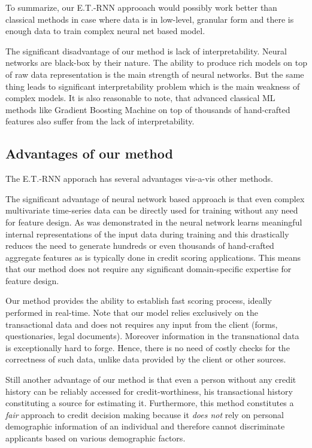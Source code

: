 \documentclass[sigconf]{acmart}
\begin{document}
To summarize, our E.T.-RNN approoach would possibly work better than classical methods in case where data is in low-level, granular form and there is enough data to train complex neural net based model.

The significant disadvantage of our method is lack of interpretability. Neural networks are black-box by their nature. The ability to produce rich models on top of raw data representation is the main strength of neural networks. But the same thing leads to significant interpretability problem which is the main weakness of complex models. It is also reasonable to note, that advanced classical ML methods like Gradient Boosting Machine on top of thousands of hand-crafted features also suffer from the lack of interpretability.

\subsection{Advantages of our method}

The E.T.-RNN apporach has several advantages vis-a-vis other methods.

The significant advantage of neural network based approach is that even complex multivariate time-series data can be directly used for training without any need for feature design. As was demonstrated in \cite{Erhan2009VisualizingHF} the neural network learns meaningful internal representations of the input data during training and this drastically reduces the need to generate hundreds or even thousands of hand-crafted aggregate features as is typically done in credit scoring applications. This means that our method does not require any significant domain-specific expertise for feature design.

Our method provides the ability to establish fast scoring process, ideally performed in real-time. Note that our model relies exclusively on the transactional data and does not requires any input from the client (forms, questionaries, legal documents).
Moreover information in the transnational data is exceptionally hard to forge. Hence, there is no need of costly checks for the correctness of such data, unlike data provided by the client or other sources.

Still another advantage of our method is that even a person without any credit history can be reliably accessed for credit-worthiness, his transactional history constituting a source for estimating it.
Furthermore, this method constitutes a \textit{fair} approach to credit decision making because it \textit{does not} rely on personal demographic information of an individual and therefore cannot discriminate applicants based on various demographic factors.
\end{document}
